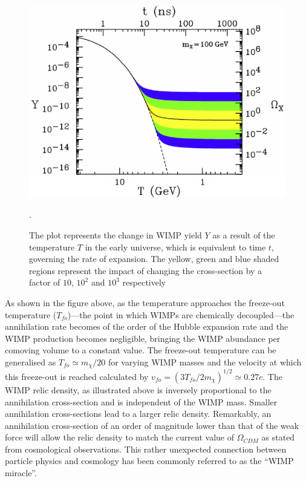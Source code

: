 \begin{figure}[h!]
    \begin{center}
        \includegraphics[scale=0.6]{Chapter_1/Figures/WIMP_Freezeout.pdf}
        \caption[Typical evolution of the WIMP number density in the early universe during the epoch of WIMP chemical freeze-out.]%
        {The plot represents the change in WIMP yield $Y$ as a result of the temperature $T$ in the early universe, which is equivalent to time $t$, governing the rate of expansion. The yellow, green and blue shaded regions represent the impact of changing the cross-section by a factor of $10$, $10^{2}$ and $10^{3}$ respectively \cite{Feng_2010}}.
        \label{fig:wimp_density_evolution}
        \end{center}
\end{figure}

As shown in the figure above, as the temperature approaches the freeze-out temperature ($T_{fo}$)---the point in which WIMPs are chemically decoupled---the annihilation rate becomes of the order of the Hubble expansion rate and the WIMP production becomes negligible, bringing the WIMP abundance per comoving volume to a constant value. The freeze-out temperature can be generalised as $T_{fo} \simeq m_\chi/20$ for varying WIMP masses and the velocity at which this freeze-out is reached calculated by $v_{fo} = (3T_{fo}/2m_{\chi})^{1/2} \simeq 0.27c$. The WIMP relic density, as illustrated above is inversely proportional to the annihilation cross-section and is independent of the WIMP mass. Smaller annihilation cross-sections lead to a larger relic density. Remarkably, an annihilation cross-section of an order of magnitude lower than that of the weak force will allow the relic density to match the current value of $\Omega_{CDM}$ as stated from cosmological observations. This rather unexpected connection between particle physics and cosmology has been commonly referred to as the “WIMP miracle”.


